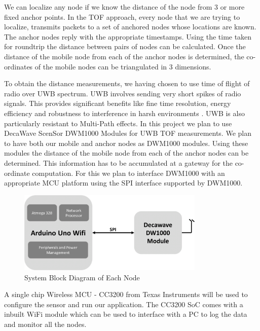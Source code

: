 \documentclass[journal,transmag]{IEEEtran}
\begin{document}
We can localize any node if we know the distance of the node from 3 or more fixed anchor points. In the TOF approach, every node that we are trying to localize, transmits packets to a set of anchored nodes whose locations are known. The anchor nodes reply with the appropriate timestamps. Using the time taken for roundtrip the distance between pairs of nodes can be calculated. Once the distance of the mobile node from each of the anchor nodes is determined, the co-ordinates of the mobile nodes can be triangulated in 3 dimensions.

To obtain the distance measurements, we having chosen to use time of flight of radio over UWB spectrum. UWB involves sending very short spikes of radio signals. This provides significant benefits like fine time resolution, energy efficiency and robustness to interference in harsh environments \cite{IEEE4}. UWB is also particularly resistant to Multi-Path effects. In this project we plan to use DecaWave ScenSor DWM1000 Modules for UWB TOF measurements. We plan to have both our mobile and anchor nodes as DWM1000 modules. Using these modules the distance of the mobile node from each of the anchor nodes can be determined.  This information has to be accumulated at a gateway for the co-ordinate computation. For this we plan to interface DWM1000 with an appropriate MCU platform using the SPI interface supported by DWM1000.

\begin{figure}[!t]
\centering
\includegraphics[width=3.5in]{nodebd.png}
\caption{{System Block Diagram of Each Node}}
\label{EACHNODEBD}
\end{figure}

A single chip Wireless MCU - CC3200 from Texas Instruments will be used to configure the sensor and run our application. The CC3200 SoC comes with a inbuilt WiFi module which can be used to interface with a PC to log the data and monitor all the nodes.
\end{document}
